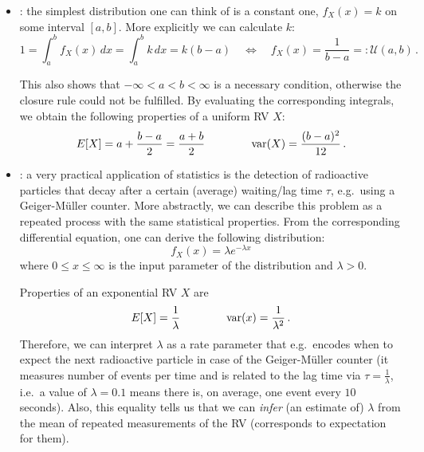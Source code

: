 \begin{ex}
\begin{itemize}
\item {}: the simplest distribution one can think of is a constant one, $f_X(x) = k$ on some interval $[a, b]$. More explicitly we can calculate $k$:
\begin{equation}
1 = \int_a^b f_X(x) \, dx = \int_a^b k \, dx = k (b - a) \quad \Leftrightarrow \quad f_X(x) = \frac{1}{b - a} =: \mathcal{U}(a, b) \, .
\end{equation}

This also shows that $- \infty < a < b < \infty$ is a necessary condition, otherwise the closure rule could not be fulfilled. By evaluating the corresponding integrals, we obtain the following properties of a uniform RV $X$:
\begin{equation}
E[X] = a + \frac{b - a}{2} = \frac{a + b}{2} \qquad \qquad \operatorname{var}(X) = \frac{(b - a)^2}{12} \, .
\end{equation}


\item {}: a very practical application of statistics is the detection of radioactive particles that decay after a certain (average) waiting/lag time $\tau$, e.g.~using a Geiger-Müller counter. More abstractly, we can describe this problem as a repeated process with the same statistical properties. From the corresponding differential equation, one can derive the following distribution:
\begin{equation}\label{eq:exp_distr}
f_X(x) = \lambda e^{- \lambda x}
\end{equation}
where $0 \leq x \leq \infty$ is the input parameter of the distribution and $\lambda > 0$.%

Properties of an exponential RV $X$ are
\begin{equation}
E[X] = \frac{1}{\lambda} \qquad \qquad \operatorname{var}(x) = \frac{1}{\lambda^2} \, .
\end{equation}
Therefore, we can interpret $\lambda$ as a rate parameter that e.g.~encodes when to expect the next radioactive particle in case of the Geiger-Müller counter (it measures number of events per time and is related to the lag time via $\tau = \frac{1}{\lambda}$, i.e.~a value of $\lambda = 0.1$ means there is, on average, one event every $10$ seconds). Also, this equality tells us that we can \emph{infer} (an estimate of) $\lambda$ from the mean of repeated measurements of the RV (corresponds to expectation for them).



\end{itemize}
\end{ex}
